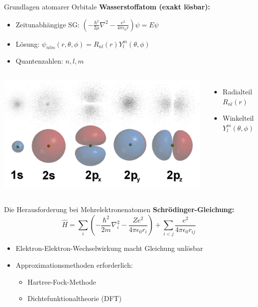 \begin{frame}{Grundlagen atomarer Orbitale}
    \textbf{Wasserstoffatom (exakt lösbar):}
    \begin{itemize}
        \item Zeitunabhängige SG: $\left(-\frac{\hbar^2}{2\mu}\nabla^2 - \frac{e^2}{4\pi\epsilon_0 r}\right)\psi = E\psi$
        \item Lösung: $\psi_{nlm}(r,\theta,\phi) = R_{nl}(r)Y_l^m(\theta,\phi)$
        \item Quantenzahlen: $n,l,m$
    \end{itemize}

    \begin{columns}
        \includegraphics[width=\textwidth]{orbitals.png}

        \begin{itemize}
            \item Radialteil $R_{nl}(r)$
            \item Winkelteil $Y_l^m(\theta,\phi)$
        \end{itemize}
    \end{columns}
\end{frame}

\begin{frame}{Die Herausforderung bei Mehrelektronenatomen}
    \textbf{Schrödinger-Gleichung:}
    \[
        \hat{H} = \sum_i \left(-\frac{\hbar^2}{2m}\nabla_i^2 - \frac{Ze^2}{4\pi\epsilon_0 r_i}\right) + \sum_{i<j} \frac{e^2}{4\pi\epsilon_0 r_{ij}}
    \]

    \begin{itemize}
        \item Elektron-Elektron-Wechselwirkung macht Gleichung unlösbar
        \item \alert{Approximationsmethoden} erforderlich:
        \begin{itemize}
            \item Hartree-Fock-Methode
            \item Dichtefunktionaltheorie (DFT)
        \end{itemize}
    \end{itemize}
\end{frame}

